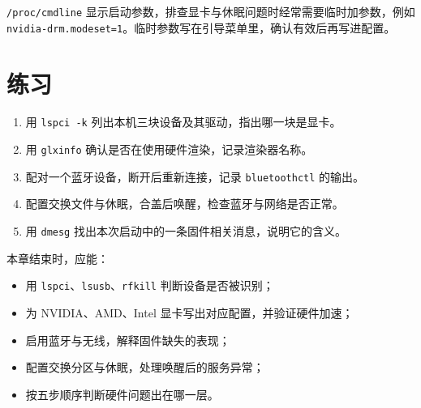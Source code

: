 
\texttt{/proc/cmdline} 显示启动参数，排查显卡与休眠问题时经常需要临时加参数，例如 \texttt{nvidia-drm.modeset=1}。临时参数写在引导菜单里，确认有效后再写进配置。

\section{练习}

\begin{enumerate}
  \item 用 \texttt{lspci -k} 列出本机三块设备及其驱动，指出哪一块是显卡。
  \item 用 \texttt{glxinfo} 确认是否在使用硬件渲染，记录渲染器名称。
  \item 配对一个蓝牙设备，断开后重新连接，记录 \texttt{bluetoothctl} 的输出。
  \item 配置交换文件与休眠，合盖后唤醒，检查蓝牙与网络是否正常。
  \item 用 \texttt{dmesg} 找出本次启动中的一条固件相关消息，说明它的含义。
\end{enumerate}

\begin{checkpoint}
本章结束时，应能：
\begin{itemize}
  \item 用 \texttt{lspci}、\texttt{lsusb}、\texttt{rfkill} 判断设备是否被识别；
  \item 为 NVIDIA、AMD、Intel 显卡写出对应配置，并验证硬件加速；
  \item 启用蓝牙与无线，解释固件缺失的表现；
  \item 配置交换分区与休眠，处理唤醒后的服务异常；
  \item 按五步顺序判断硬件问题出在哪一层。
\end{itemize}
\end{checkpoint}
